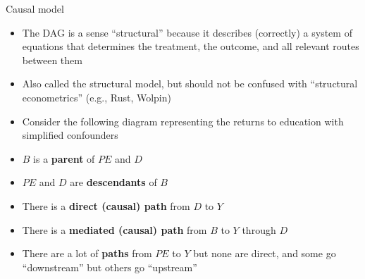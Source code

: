 \documentclass{beamer}
\begin{document}
\begin{frame}{Causal model}

  \begin{itemize}
    \item The DAG is a sense  ``structural'' because it describes (correctly) a system of equations that determines the treatment, the outcome, and all relevant routes between them
        \item Also called the structural model, but should not be confused with ``structural econometrics'' (e.g., Rust, Wolpin)
    \item Consider the following diagram representing the returns to education with simplified confounders
  \end{itemize}

\end{frame}

\begin{frame}[plain]

  \begin{center}
  \end{center}

  \bigskip
  \begin{itemize}
    \item $B$ is a \textbf{parent} of $PE$ and $D$
    \item $PE$ and $D$ are \textbf{descendants} of $B$
    \item There is a \textbf{direct (causal) path} from $D$ to $Y$
    \item There is a \textbf{mediated (causal) path} from $B$ to $Y$ through $D$
    \item There are a lot of \textbf{paths} from $PE$ to $Y$ but none are direct, and some go ``downstream'' but others go ``upstream''
  \end{itemize}
\end{frame}
\end{document}
